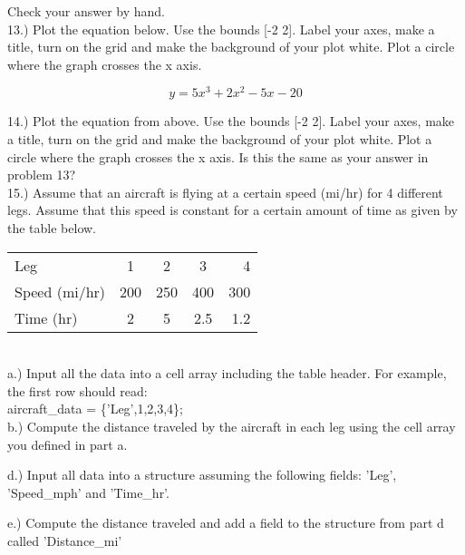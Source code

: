 Check your answer by hand.
\ \\

13.) Plot the equation below. Use the bounds [-2 2]. Label your
axes, make a title, turn on the grid and make the background of your
plot white. Plot a circle where the graph crosses the x axis. 

\begin{equation} \nonumber
y = 5x^3 + 2x^2 - 5x - 20
\end{equation} 

14.) Plot the equation from above. Use the bounds [-2 2]. Label your
axes, make a title, turn on the grid and make the background of your
plot white. Plot a circle where the graph crosses the x axis. Is this
the same as your answer in problem 13?
\ \\

15.) Assume that an aircraft is flying at a certain speed (mi/hr) for
4 different legs. Assume that this speed is constant for a certain
amount of time as given by the table below.
\ \\

\begin{tabular}{l c c c r}
Leg & 1 & 2 & 3 & 4 \\
Speed (mi/hr) & 200 & 250 & 400 & 300 \\
Time (hr) & 2 & 5 & 2.5 & 1.2
\end{tabular}
\ \\

a.) Input all the data into a cell array including the table
header. For example, the first row should read:
\ \\

aircraft\_data = \{'Leg',1,2,3,4\};
\ \\

b.) Compute the distance traveled by the aircraft in each leg using
the cell array you defined in part a.

d.) Input all data into a structure assuming the
following fields: 'Leg', 'Speed\_mph' and 'Time\_hr'. 

e.) Compute the distance traveled and add a field to the structure
from part d called 'Distance\_mi'
\ \\
